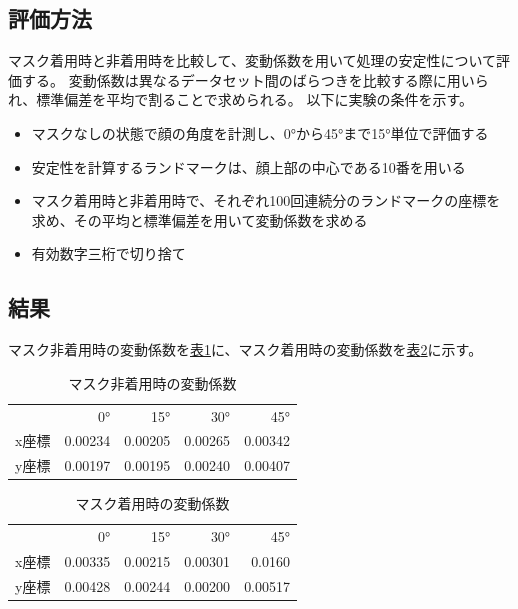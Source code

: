 \documentclass[]{jarticle}          %
\begin{document}
\subsection{評価方法}
マスク着用時と非着用時を比較して、変動係数を用いて処理の安定性について評価する。
変動係数は異なるデータセット間のばらつきを比較する際に用いられ、標準偏差を平均で割ることで求められる。
以下に実験の条件を示す。
\begin{itemize}
  \item マスクなしの状態で顔の角度を計測し、0°から45°まで15°単位で評価する
  \item 安定性を計算するランドマークは、顔上部の中心である10番を用いる
  \item マスク着用時と非着用時で、それぞれ100回連続分のランドマークの座標を求め、その平均と標準偏差を用いて変動係数を求める
  \item 有効数字三桁で切り捨て
\end{itemize}

\subsection{結果}
マスク非着用時の変動係数を\hyperref[one]{表\ref{one}}に、マスク着用時の変動係数を\hyperref[two]{表\ref{two}}に示す。
\begin{table}[ht!]
  \begin{center}
    \begin{tabular}{lrrrr}
      & 0° & 15° & 30° & 45° \\
      x座標 & 0.00234 & 0.00205 & 0.00265 & 0.00342 \\
      y座標 & 0.00197 & 0.00195 & 0.00240 & 0.00407 
    \end{tabular}
    \caption{マスク非着用時の変動係数}
    \label{one}
  \end{center}
\end{table}

\begin{table}[ht!]
  \begin{center}
    \begin{tabular}{lrrrr}
      & 0° & 15° & 30° & 45° \\
      x座標 & 0.00335 & 0.00215 & 0.00301 & 0.0160 \\
      y座標 & 0.00428 & 0.00244 & 0.00200 & 0.00517 
    \end{tabular}
    \caption{マスク着用時の変動係数}
    \label{two}
  \end{center}
\end{table}
\end{document}
